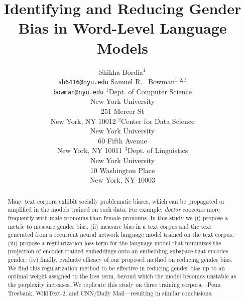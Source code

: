 \documentclass[11pt,a4paper]{article}
\title{Identifying and Reducing Gender Bias in Word-Level Language Models}
\author{
Shikha Bordia$^{1}$\\
{\tt sb6416@nyu.edu} 
\And
Samuel R. ~Bowman$^{1,2,3}$\\
{\tt bowman@nyu.edu}
\AND
$^{1}$\normalfont Dept. of Computer Science\\New York University\\251 Mercer St\\New York, NY 10012 \And
$^{2}$\normalfont Center for Data Science\\New York University\\60 Fifth Avenue\\New York, NY 10011\And
$^{3}$\normalfont Dept. of Linguistics\\New York University\\10 Washington Place\\New York, NY 10003
  }
\newcommand{\note}[4][]{\todo[author=#2,color=#3,size=\scriptsize,fancyline,caption={},#1]{#4}} %
\newcommand{\phu}[2][]{\note[#1]{Phu}{violet!40}{#2}}
\newcommand{\sam}[2][]{\note[#1]{Sam}{orange!40}{#2}}
\begin{document}
\maketitle
\begin{abstract}
 
Many text corpora exhibit socially problematic biases, which can be propagated  or  amplified  in  the  models trained on such data. For example, \textit{doctor} cooccurs more frequently with male pronouns than female pronouns. In this study we (i) propose a metric  to measure gender bias; (ii) measure bias in a text corpus and the text generated from a recurrent  neural  network language model trained on the text corpus; (iii) propose a regularization loss term for the language model that minimizes the projection of encoder-trained embeddings onto an embedding subspace that encodes gender; (iv) finally, evaluate efficacy of our proposed method on reducing gender bias. We find this regularization method to be effective in reducing gender bias up to  an  optimal weight assigned to the loss term, beyond  which the model becomes unstable as the perplexity increases. We replicate this study on three training corpora---Penn Treebank,  WikiText-2, and CNN/Daily Mail---resulting in similar conclusions.

\end{abstract}
\end{document}
